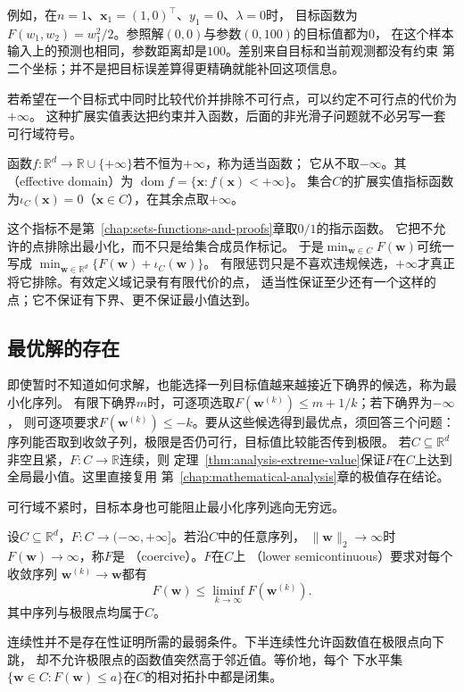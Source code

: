 例如，在$n=1$、$\bm{x}_1=(1,0)^\top$、$y_1=0$、$\lambda=0$时，
目标函数为$F(w_1,w_2)=w_1^2/2$。参照解$(0,0)$与参数$(0,100)$的目标值都为$0$，
在这个样本输入上的预测也相同，参数距离却是$100$。差别来自目标和当前观测都没有约束
第二个坐标；并不是把目标误差算得更精确就能补回这项信息。

若希望在一个目标式中同时比较代价并排除不可行点，可以约定不可行点的代价为$+\infty$。
这种扩展实值表达把约束并入函数，后面的非光滑子问题就不必另写一套可行域符号。
\begin{definition}
\label{def:opt-proper-domain-indicator}
函数$f:\mathbb R^d\to\mathbb R\cup\{+\infty\}$若不恒为$+\infty$，称为适当函数；
它从不取$-\infty$。其（effective domain）为
$\operatorname{dom}f=\{\bm x:f(\bm x)<+\infty\}$。
集合$C$的扩展实值指标函数为$\iota_C(\bm x)=0$（$\bm x\in C$），在其余点取$+\infty$。
\end{definition}
这个指标不是第~\ref{chap:sets-functions-and-proofs}章取$0/1$的指示函数。
它把不允许的点排除出最小化，而不只是给集合成员作标记。
于是$\min_{\bm w\in C}F(\bm w)$可统一写成
$\min_{\bm w\in\mathbb R^d}\{F(\bm w)+\iota_C(\bm w)\}$。
有限惩罚只是不喜欢违规候选，$+\infty$才真正将它排除。有效定义域记录有有限代价的点，
适当性保证至少还有一个这样的点；它不保证有下界、更不保证最小值达到。

\subsection{最优解的存在}
\label{sec:opt-existence}

即使暂时不知道如何求解，也能选择一列目标值越来越接近下确界的候选，称为最小化序列。
有限下确界$m$时，可逐项选取$F(\bm w^{(k)})\leq m+1/k$；若下确界为$-\infty$，
则可逐项要求$F(\bm w^{(k)})\leq-k$。要从这些候选得到最优点，须回答三个问题：
序列能否取到收敛子列，极限是否仍可行，目标值比较能否传到极限。
若$C\subseteq\mathbb{R}^d$非空且紧，$F:C\to\mathbb{R}$连续，则
定理~\ref{thm:analysis-extreme-value}保证$F$在$C$上达到全局最小值。这里直接复用
第~\ref{chap:mathematical-analysis}章的极值存在结论。

可行域不紧时，目标本身也可能阻止最小化序列逃向无穷远。
\begin{definition}[强制性与下半连续性]
\label{def:opt-coercive-lower-semicontinuous}
设$C\subseteq\mathbb R^d$，$F:C\to(-\infty,+\infty]$。若沿$C$中的任意序列，
$\lVert\bm{w}\rVert_2\to\infty$时$F(\bm{w})\to\infty$，称$F$是
（coercive）。$F$在$C$上
（lower semicontinuous）要求对每个收敛序列
$\bm{w}^{(k)}\to\bm{w}$都有
\[
  F(\bm{w})\leq\liminf_{k\to\infty}F(\bm{w}^{(k)}).
\]
其中序列与极限点均属于$C$。
\end{definition}
连续性并不是存在性证明所需的最弱条件。下半连续性允许函数值在极限点向下跳，
却不允许极限点的函数值突然高于邻近值。等价地，每个
下水平集$\{\bm{w}\in C:F(\bm{w})\leq a\}$在$C$的相对拓扑中都是闭集。

